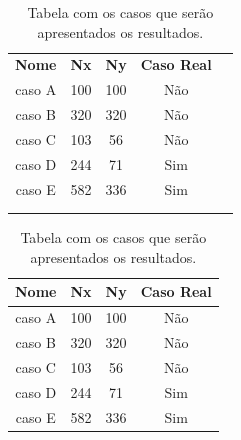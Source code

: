 \begin{table}[]
    \caption{Tabela com os casos que serão apresentados os resultados. }\label{tab:descricaoModelos}
    \centering
    \begin{tabular}{ccccl}
    \cline{1-4}
    \multicolumn{1}{|c|}{\textbf{Nome}} & \multicolumn{1}{c|}{\textbf{Nx}} & \multicolumn{1}{c|}{\textbf{Ny}} & \multicolumn{1}{c|}{\textbf{Caso Real}} &  \\ \cline{1-4}
    \multicolumn{1}{|c|}{caso A}        & \multicolumn{1}{c|}{100}         & \multicolumn{1}{c|}{100}         & \multicolumn{1}{c|}{Não}                   &  \\ \cline{1-4}
    \multicolumn{1}{|c|}{caso B}        & \multicolumn{1}{c|}{320}         & \multicolumn{1}{c|}{320}         & \multicolumn{1}{c|}{Não}                   &  \\ \cline{1-4}
    \multicolumn{1}{|c|}{caso C}        & \multicolumn{1}{c|}{103}         & \multicolumn{1}{c|}{56}          & \multicolumn{1}{c|}{Não}                   &  \\ \cline{1-4}
    \multicolumn{1}{|c|}{caso D}        & \multicolumn{1}{c|}{244}         & \multicolumn{1}{c|}{71}          & \multicolumn{1}{c|}{Sim}                &  \\ \cline{1-4}
    \multicolumn{1}{|c|}{caso E}        & \multicolumn{1}{c|}{582}         & \multicolumn{1}{c|}{336}         & \multicolumn{1}{c|}{Sim}                &  \\ \cline{1-4}
    \multicolumn{1}{l}{}                & \multicolumn{1}{l}{}             & \multicolumn{1}{l}{}             & \multicolumn{1}{l}{}                    &  \\
    \multicolumn{1}{l}{}                & \multicolumn{1}{l}{}             & \multicolumn{1}{l}{}             & \multicolumn{1}{l}{}                    & 
    \end{tabular}
\end{table}


\begin{table}[htb]
    \caption{Tabela com os casos que serão apresentados os resultados. }\label{tab:descricaoModelos_lmc}
    \centering
    \begin{tabular}{@{}cccc@{}}
    \toprule
    \textbf{Nome}&\textbf{Nx}&\textbf{Ny}&\textbf{Caso Real}\\
    \midrule
    caso A &100 &100 & Não\\
    caso B &320 &320 & Não\\
    caso C &103 &56 & Não\\
    caso D &244 &71 & Sim\\
   caso E & 582 &336 & Sim\\
    \bottomrule
    \end{tabular}
    \end{table}
    

